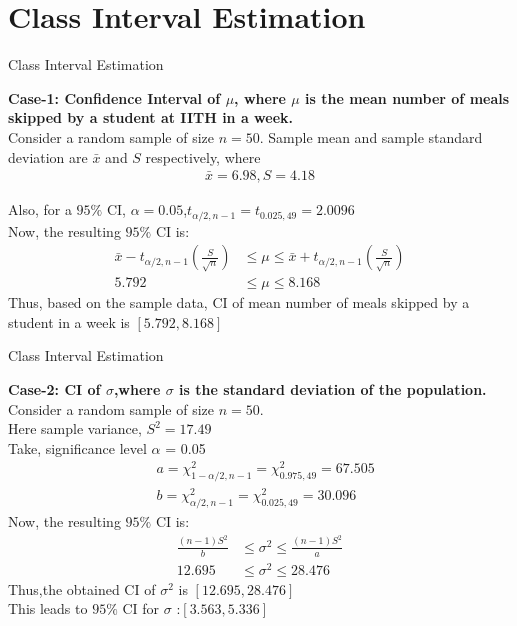 \documentclass{beamer}
\begin{document}
\section{Class Interval Estimation}
\begin{frame}{Class Interval Estimation}
    \begin{block}{}
        \textbf{Case-1: Confidence Interval of $\mu$, where $\mu$ is the mean number of meals skipped by a student at IITH in a week. } \\
       Consider a random sample of size $n = 50$. 
       Sample mean and sample standard deviation are $\bar{x}$ and $S$ respectively, where
        \begin{align*}
            \bar{x}= 6.98, 
            S = 4.18 
        \end{align*}       
      
Also, for a $95\%$ CI, $\alpha=0.05$,$t_{\alpha/2,n-1} =t_{0.025,49}=2.0096$ \\
Now, the resulting $95\%$ CI is:
      \begin{align*}
        \bar{x}-t_{\alpha/2,n-1}\left(\frac{S}{\sqrt{n}}\right) &\leq \mu \leq \bar{x}+t_{\alpha/2,n-1}\left(\frac{S}{\sqrt{n}}\right)\\
        5.792 &\leq \mu \leq 8.168
      \end{align*}
      Thus, based on the sample data, CI of mean number of meals skipped by a student in a week is $[5.792,8.168]$ 
      \end{block}
\end{frame}
\begin{frame}{Class Interval Estimation}
    \begin{block}{}
        \textbf{Case-2: CI of $\sigma$,where $\sigma$ is the standard deviation of the population.} \\
       Consider a random sample of size $n = 50$.   \\
       Here sample variance,    $S^2 = 17.49$  \\
       Take, significance level $\alpha$ = 0.05                
        \begin{align*}
            &a = \chi^{2}_{1-\alpha/2,n-1} = \chi^{2}_{0.975,49} =67.505 \\
            &b = \chi^{2}_{\alpha/2,n-1} = \chi^{2}_{0.025,49} = 30.096
        \end{align*} 
        Now, the resulting $95\%$ CI is:
        \begin{align*}
            \frac{(n-1)S^2}{b} &\leq \sigma^2 \leq \frac{(n-1)S^2}{a}\\
            12.695 &\leq \sigma^2 \leq 28.476
          \end{align*}
          Thus,the obtained CI of $\sigma^2$ is $[12.695,28.476]$\\
          This leads to $95\%$ CI for $\sigma$ :$[3.563,5.336]$ 
           \end{block}
\end{frame}
\end{document}
